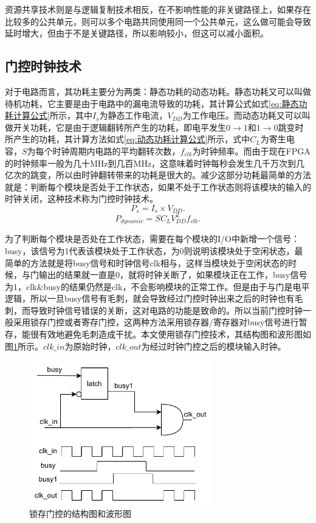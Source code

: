   资源共享技术则是与逻辑复制技术相反，在不影响性能的非关键路径上，如果存在比较多的公共单元，则可以多个电路共同使用同一个公共单元，这么做可能会导致延时增大，但由于不是关键路径，所以影响较小，但这可以减小面积。

\subsection{门控时钟技术}
对于电路而言，其功耗主要分为两类：静态功耗的动态功耗。静态功耗又可以叫做待机功耗，它主要是由于电路中的漏电流导致的功耗，其计算公式如式\eqref{eq:静态功耗计算公式}所示，其中$I_s$为静态工作电流，$V_{DD}$为工作电压。而动态功耗又可以叫做开关功耗，它是由于逻辑翻转所产生的功耗，即电平发生$0\rightarrow1$和$1\rightarrow0$跳变时所产生的功耗，其计算方法如式\eqref{eq:动态功耗计算公式}所示，式中$C_L$为寄生电容，$S$为每个时钟周期内电路的平均翻转次数，$f_{clk}$为时钟频率。而由于现在FPGA的时钟频率一般为几十MHz到几百MHz，这意味着时钟每秒会发生几千万次到几亿次的跳变，所以由时钟翻转带来的功耗是很大的。减少这部分功耗最简单的方法就是：判断每个模块是否处于工作状态，如果不处于工作状态则将该模块的输入的时钟关闭，这种技术称为门控时钟技术。
\begin{equation}\label{eq:静态功耗计算公式}
    P_s = I_s \times V_{DD}.
    \end{equation}
\begin{equation}\label{eq:动态功耗计算公式}
    P_{dynamic}=SC_LV^2_{DD}f_{clk}.
    \end{equation}


为了判断每个模块是否处在工作状态，需要在每个模块的I/O中新增一个信号：busy，该信号为1代表该模块处于工作状态，为0则说明该模块处于空闲状态，最简单的方法就是将busy信号和时钟信号clk相与，这样当模块处于空闲状态的时候，与门输出的结果就一直是0，就将时钟关断了，如果模块正在工作，busy信号为1，clk$\&$busy的结果仍然是clk，不会影响模块的正常工作。但是由于与门是电平逻辑，所以一旦busy信号有毛刺，就会导致经过门控时钟出来之后的时钟也有毛刺，而导致时钟信号错误的关断，这对电路的功能是致命的。所以当前门控时钟一般采用锁存门控或者寄存门控，这两种方法采用锁存器/寄存器对busy信号进行暂存，能很有效地避免毛刺造成干扰。本文使用锁存门控技术，其结构图和波形图如图\ref{fig:锁存门控的结构图和波形图}所示。$clk\_in$为原始时钟，$clk\_out$为经过时钟门控之后的模块输入时钟。
\begin{figure}[htb]
    \centering
    \includegraphics[width=8cm]{fig/5-fig/锁存门控的结构图和波形图.drawio.pdf}
    \caption{锁存门控的结构图和波形图}
    \label{fig:锁存门控的结构图和波形图}
\end{figure}

